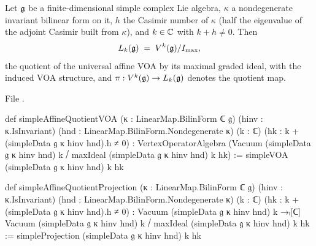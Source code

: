 \begin{definition}\label{l23:def:simpleaffinequotient}
Let $\mathfrak g$ be a finite-dimensional simple complex Lie algebra, $\kappa$ a nondegenerate invariant bilinear form on it, $h$ the
Casimir number of $\kappa$ (half the eigenvalue of the adjoint Casimir built from $\kappa$), and $k\in{\mathbb{C}}$ with $k+h\ne0$. Then
\begin{equation*}
L_k(\mathfrak g)\;=\;V^k(\mathfrak g)/I_{\max},
\end{equation*}
the quotient of the universal affine VOA by its maximal graded ideal, with the induced VOA structure, and
$\pi:V^k(\mathfrak g)\to L_k(\mathfrak g)$ denotes the quotient map.
\end{definition}
\noindent File .
\begin{leancode}
def simpleAffineQuotientVOA (κ : LinearMap.BilinForm ℂ 𝔤) (hinv : κ.IsInvariant)
    (hnd : LinearMap.BilinForm.Nondegenerate κ) (k : ℂ) (hk : k + (simpleData 𝔤 κ hinv hnd).h ≠ 0) :
    VertexOperatorAlgebra
      (Vacuum (simpleData 𝔤 κ hinv hnd) k ⧸ maxIdeal (simpleData 𝔤 κ hinv hnd) k hk) :=
  simpleVOA (simpleData 𝔤 κ hinv hnd) k hk

def simpleAffineQuotientProjection (κ : LinearMap.BilinForm ℂ 𝔤) (hinv : κ.IsInvariant)
    (hnd : LinearMap.BilinForm.Nondegenerate κ) (k : ℂ) (hk : k + (simpleData 𝔤 κ hinv hnd).h ≠ 0) :
    Vacuum (simpleData 𝔤 κ hinv hnd) k →ₗ[ℂ]
      Vacuum (simpleData 𝔤 κ hinv hnd) k ⧸ maxIdeal (simpleData 𝔤 κ hinv hnd) k hk :=
  simpleProjection (simpleData 𝔤 κ hinv hnd) k hk
\end{leancode}

